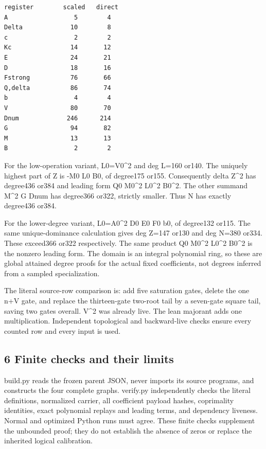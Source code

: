 \begin{verbatim}
register        scaled   direct
A                  5        4
Delta             10        8
c                  2        2
Kc                14       12
E                 24       21
D                 18       16
Fstrong           76       66
Q,delta           86       74
b                  4        4
V                 80       70
Dnum             246      214
G                 94       82
M                 13       13
B                  2        2
\end{verbatim}

For the low-operation variant, L0=\allowbreak{}V0\textasciicircum{}\allowbreak{}2 and deg L=\allowbreak{}160 or140. The uniquely highest part of Z is -M0 L0 B0, of degree175 or155. Consequently delta Z\textasciicircum{}\allowbreak{}2 has degree436 or384 and leading form Q0 M0\textasciicircum{}\allowbreak{}2 L0\textasciicircum{}\allowbreak{}2 B0\textasciicircum{}\allowbreak{}2. The other summand M\textasciicircum{}\allowbreak{}2 G Dnum has degree366 or322, strictly smaller. Thus N has exactly degree436 or384.



For the lower-degree variant, L0=\allowbreak{}A0\textasciicircum{}\allowbreak{}2 D0 E0 F0 b0, of degree132 or115. The same unique-dominance calculation gives deg Z=\allowbreak{}147 or130 and deg N=\allowbreak{}380 or334. These exceed366 or322 respectively. The same product Q0 M0\textasciicircum{}\allowbreak{}2 L0\textasciicircum{}\allowbreak{}2 B0\textasciicircum{}\allowbreak{}2 is the nonzero leading form. The domain is an integral polynomial ring, so these are global attained degree proofs for the actual fixed coefficients, not degrees inferred from a sampled specialization.



The literal source-row comparison is: add five saturation gates, delete the one n+\allowbreak{}V gate, and replace the thirteen-gate two-root tail by a seven-gate square tail, saving two gates overall. V\textasciicircum{}\allowbreak{}2 was already live. The lean majorant adds one multiplication. Independent topological and backward-live checks ensure every counted row and every input is used.



\subsection{6 Finite checks and their limits}



build.py reads the frozen parent JSON, never imports its source programs, and constructs the four complete graphs. verify.py independently checks the literal definitions, normalized carrier, all coefficient payload hashes, coprimality identities, exact polynomial replays and leading terms, and dependency liveness. Normal and optimized Python runs must agree. These finite checks supplement the unbounded proof; they do not establish the absence of zeros or replace the inherited logical calibration.

